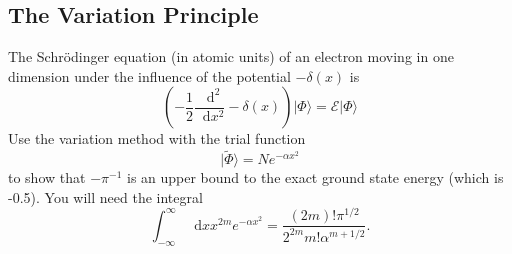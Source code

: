 \documentclass[a4paper]{book}
\newcounter{exercise}[chapter]
\newcommand*{\dif}{\mathop{}\!\mathrm{d}}
\begin{document}
	\subsection{The Variation Principle}
	
	\begin{exercise}
	The Schr{\"o}dinger equation (in atomic units) of an electron moving in one dimension under the influence of the potential $-\delta(x)$ is
	\begin{equation*}
		\left(-\frac 12 \frac{\dif^2}{\dif x^2}-\delta(x)\right) | \Phi \rangle = \mathscr{E} | \Phi \rangle
	\end{equation*}
	Use the variation method with the trial function
	\begin{equation*}
		| \tilde{\Phi} \rangle = N e^{-\alpha x^2}
	\end{equation*}
	to show that $-\pi^{-1}$ is an upper bound to the exact ground state energy (which is -0.5). You will need the integral
	\begin{equation*}
		\int_{-\infty}^{\infty} \dif x x^{2m} e^{-\alpha x^2} = \frac{(2m)!\pi^{1/2}}{2^{2m}m!\alpha^{m+1/2}}.
	\end{equation*}
	\end{exercise}
	
\end{document}
